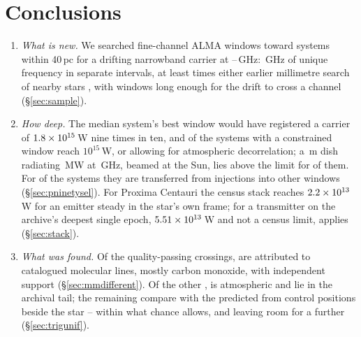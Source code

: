 \section{Conclusions}
\label{sec:conclusions}

\begin{enumerate}[leftmargin=1.6em,itemsep=4pt,topsep=4pt,parsep=0pt]

\item \emph{What is new.} We searched \NWinA{} fine-channel ALMA windows
toward \NSysClassA{} systems within 40\,pc for a drifting narrowband carrier at
\SurvFreqLoA--\SurvFreqHiA\,GHz: \CvUnionA\,GHz of unique frequency in
\CovNIslands{} separate intervals, at least \SbPriorRatio{} times either
earlier millimetre search of nearby stars \citep{Steffes1994,Mauersberger1996},
with \EdrNWinA{} windows long enough for the drift to cross a channel
(\S\ref{sec:sample}).

\item \emph{How deep.} The median system's best window would have registered a
carrier of $1.8\times10^{15}$\,W nine times in ten, and \NSysEfifteen{} of
the \NSysALim{} systems with a constrained window reach $10^{15}$\,W, or
\NmDecAdjNEfifteen{} allowing for atmospheric decorrelation; a
\BenchDiam\,m dish radiating \BenchPowerMW\,MW at \BenchFreqGHz\,GHz, beamed at
the Sun, lies above the limit for \BenchNSysA{} of them. For \SmcNEstSys{} of the \NSysALim{}
systems they are transferred from injections into other windows
(\S\ref{sec:pninetysel}). For Proxima Centauri the census stack reaches
$2.2\times10^{13}$\,W for an emitter steady in the star's own frame;
for a transmitter on \PxPlanet{} the archive's deepest single epoch,
$5.51 \times 10^{13}$\,W and not a census limit, applies (\S\ref{sec:stack}).

\item \emph{What was found.} Of the \EvNCrossQp{} quality-passing crossings, \EvNAttrQp{} are attributed to catalogued
molecular lines, mostly carbon monoxide, \LnAttrSupp{} with independent support
(\S\ref{sec:mmdifferent}). Of the other \EvNUnattrQp{}, \CeTlObsCutWord{} is
atmospheric and \CeNTailCrossWord{} lie in the archival tail; the remaining
\CeObs{} compare with the \CeExp{} predicted from control positions beside the
star -- within what chance allows, and leaving room for a further \CeAddLim{}
(\S\ref{sec:trigunif}).


\end{enumerate}
